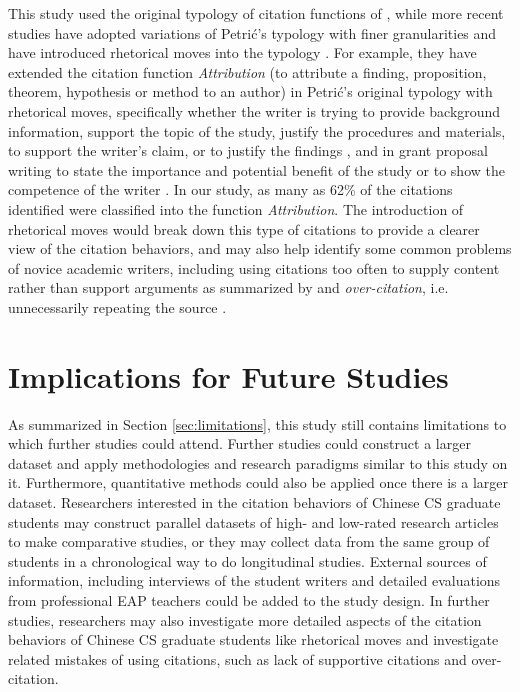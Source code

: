This study used the original typology of citation functions of \citet{petric_rhetorical_2007}, while more recent studies have adopted variations of Petrić’s typology with finer granularities and have introduced rhetorical moves into the typology \citep{fazel_citation_2015,mansourizadeh_citation_2011}. For example, they have extended the citation function \textit{Attribution} (to attribute a finding, proposition, theorem, hypothesis or method to an author) in Petrić’s original typology with rhetorical moves, specifically whether the writer is trying to provide background information, support the topic of the study, justify the procedures and materials, to support the writer’s claim, or to justify the findings \citep{mansourizadeh_citation_2011}, and in grant proposal writing to state the importance and potential benefit of the study or to show the competence of the writer \citep{fazel_citation_2015}. In our study, as many as 62\% of the citations identified were classified into the function \textit{Attribution}. The introduction of rhetorical moves would break down this type of citations to provide a clearer view of the citation behaviors, and may also help identify some common problems of novice academic writers, including using citations too often to supply content rather than support arguments as summarized by \citet{wette_source_2017}  and \textit{over-citation}, i.e. unnecessarily repeating the source \citep{davis_development_2013,petric_legitimate_2012,schmitt_writing_2007}.

\section{Implications for Future Studies}
As summarized in Section \ref{sec:limitations}, this study still contains limitations to which further studies could attend. Further studies could construct a larger dataset and apply methodologies and research paradigms similar to this study on it. Furthermore, quantitative methods could also be applied once there is a larger dataset. Researchers interested in the citation behaviors of Chinese CS graduate students may construct parallel datasets of high- and low-rated research articles to make comparative studies, or they may collect data from the same group of students in a chronological way to do longitudinal studies. External sources of information, including interviews of the student writers and detailed evaluations from professional EAP teachers could be added to the study design. In further studies, researchers may also investigate more detailed aspects of the citation behaviors of Chinese CS graduate students like rhetorical moves and investigate related mistakes of using citations, such as lack of supportive citations and over-citation.

